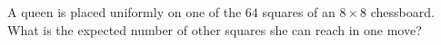 A queen is placed uniformly on one of the $64$ squares of an $8\times8$ chessboard. What is the expected number of other squares she can reach in one move?
